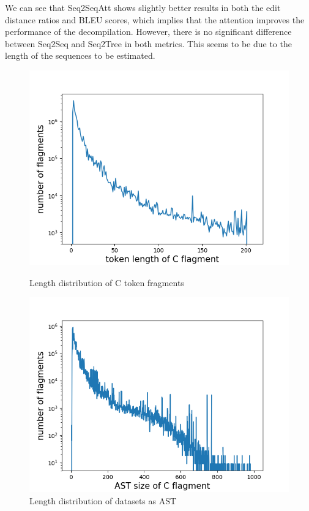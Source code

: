 \documentclass[11pt]{jarticle}
\begin{document}
We can see that Seq2SeqAtt shows slightly better results in both the edit distance ratios and BLEU scores,
 which implies that the attention improves the performance of the decompilation.
However, there is no significant difference between Seq2Seq and Seq2Tree in both metrics.
This seems to be due to the length of the sequences to be estimated.

\begin{figure}[]
	\includegraphics[width=12cm]{c_lens.png}
	\caption{Length distribution of C token fragments}
	\label{fig:csizes}
	\includegraphics[width=12cm]{ast_lens.png}
	\caption{Length distribution of datasets as AST}
	\label{fig:astsizes}
\end{figure}
\end{document}
